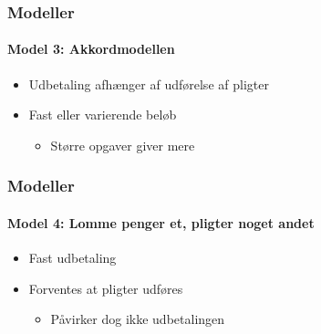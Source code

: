 \begin{frame}
\frametitle{Modeller}
\framesubtitle{\textbf{Model 3:} Akkordmodellen}
    \begin{itemize}
        \item{Udbetaling afhænger af udførelse af pligter}
        \item{Fast eller varierende beløb}
            \begin{itemize}
                \item{Større opgaver giver mere}
            \end{itemize}
    \end{itemize}
    \vspace{\baselineskip}
    \pause
\end{frame}

\begin{frame}
\frametitle{Modeller}
\framesubtitle{\textbf{Model 4:} Lomme penger et, pligter noget andet}
    \begin{itemize}
        \item{Fast udbetaling}
        \item{Forventes at pligter udføres}
            \begin{itemize}
                \item{Påvirker dog ikke udbetalingen}
            \end{itemize}
    \end{itemize}    
    \vspace{\baselineskip}
    \pause
\end{frame}

